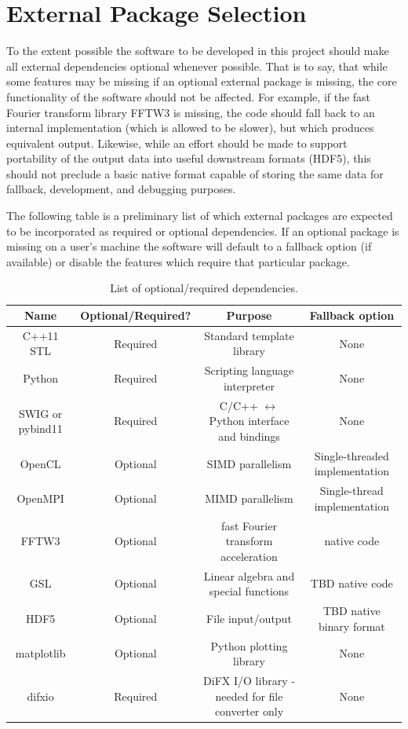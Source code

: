 \documentclass[hidelinks]{article}
\let\Oldsection\section
\renewcommand{\section}{\FloatBarrier\Oldsection}
\begin{document}
\section{External Package Selection}

To the extent possible the software to be developed in this project should make all external dependencies optional whenever possible. That is to say, that
while some features may be missing if an optional external package is missing, the core functionality of the software should not be affected. For example, if the fast Fourier transform library FFTW3 is missing, the code should fall back to an internal implementation (which is allowed to be slower), but which produces equivalent output. Likewise, while an effort should be made to support portability of the output data into useful downstream formats (HDF5), this should not preclude a
basic native format capable of storing the same data for fallback, development, and debugging purposes.

The following table is a preliminary list of which external packages are expected to be incorporated as required or optional dependencies. If an optional package is missing on a user's machine the software will default to a fallback option (if available) or disable the features which require that particular package.

\begin{center}
\begin{table}[h!]
\begin{adjustbox}{width=\textwidth}
\begin{tabular}{|c|c|c|c|}
\hline
Name & Optional/Required? & Purpose & Fallback option \\ \hline
C++11 STL & Required & Standard template library & None \\ \hline
Python &  Required & Scripting language interpreter & None \\ \hline
SWIG or pybind11 & Required & C/C++ $\leftrightarrow$ Python interface and bindings & None \\ \hline
OpenCL & Optional & SIMD parallelism & Single-threaded implementation \\ \hline
OpenMPI & Optional & MIMD parallelism & Single-thread implementation \\ \hline
FFTW3 & Optional & fast Fourier transform acceleration & native code \\ \hline
GSL & Optional & Linear algebra and special functions & TBD native code \\ \hline
HDF5 & Optional & File input/output & TBD native binary format \\ \hline
matplotlib & Optional & Python plotting library & None \\ \hline
difxio & Required & DiFX I/O library - needed for file converter only & None \\ \hline
\end{tabular}
\end{adjustbox}
\caption{List of optional/required dependencies.}
\label{tab:dep}
\end{table}
\end{center}
\end{document}
